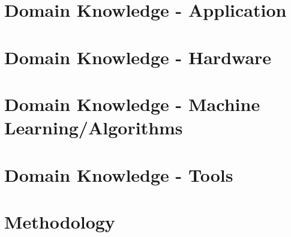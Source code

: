 \documentclass[10pt,a4paper,bibliography=totoc]{scrbook}
\begin{document}
    
   

\tableofcontents
\newpage

\listoffigures
\newpage

\listofcodes
\cleardoublepage

%

\newpage


  
  
  
\part{Domain Knowledge - Application}  

  

\part{Domain Knowledge - Hardware}  

  

  

  

\part{Domain Knowledge - Machine Learning/Algorithms}  

  


\part{Domain Knowledge - Tools}  

  

  


\part{Methodology}  
\end{document}
